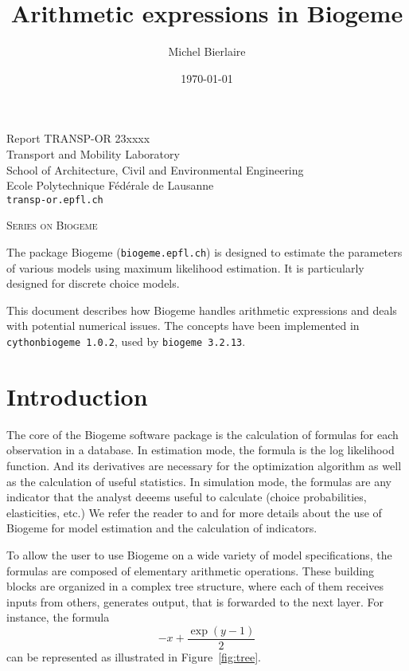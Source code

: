 \documentclass[12pt,a4paper]{article}
\title{Arithmetic expressions in Biogeme}
\author{Michel Bierlaire}
\date{\today}
\begin{document}
\begin{titlepage}
  \pagestyle{empty}

  \maketitle
  \vspace{2cm}

  \begin{center}
    \small Report TRANSP-OR 23xxxx \\ Transport and Mobility Laboratory \\ School of Architecture, Civil and Environmental Engineering \\ Ecole Polytechnique F\'ed\'erale de Lausanne \\ \verb+transp-or.epfl.ch+
    \begin{center}
      \textsc{Series on Biogeme}
    \end{center}
  \end{center}


  \clearpage
\end{titlepage}


The package Biogeme (\texttt{biogeme.epfl.ch}) is designed to estimate
the parameters of various models using maximum likelihood
estimation. It is particularly designed for discrete choice
models.

This document describes how Biogeme handles arithmetic expressions and
deals with potential numerical issues. The concepts have been
implemented in  \lstinline+cythonbiogeme 1.0.2+, used by
\lstinline+biogeme 3.2.13+.


\section{Introduction}\label{eq:intro}

The core of the Biogeme software package is the calculation of
formulas for each observation in a database. In estimation mode, the
formula is the log likelihood function. And its derivatives are
necessary for the optimization algorithm as well as the calculation of
useful statistics.  In simulation mode, the formulas are any indicator
that the analyst deeems useful to calculate (choice probabilities,
elasticities, etc.) We refer the reader to  and
 for more details about the use of Biogeme for
model estimation and the calculation of indicators.


To allow the user to use Biogeme on a wide variety of model
specifications, the formulas are composed of elementary arithmetic
operations. These building blocks are organized in a complex tree structure, where each of them receives inputs from others, generates output, that is forwarded to the next layer.
For instance, the formula
\[
-x + \frac{\exp(y - 1)}{2}
\]
can be represented as illustrated in Figure~\ref{fig:tree}.
\end{document}

